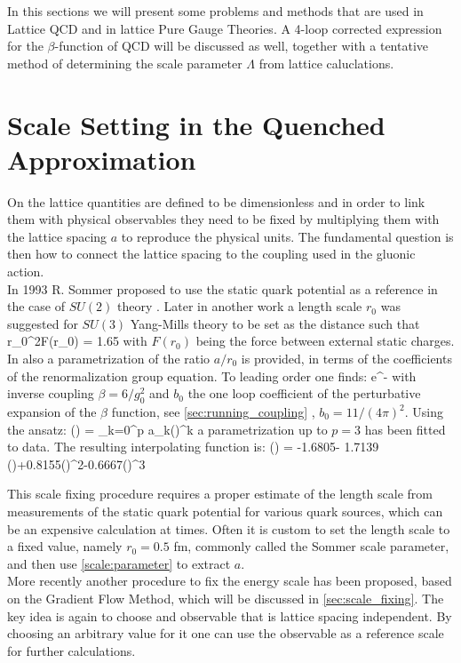 In this sections we will present some problems and methods that are used in Lattice QCD and in lattice Pure Gauge Theories. A 4-loop corrected expression for the $\beta$-function of QCD will be discussed as well, together with a tentative method of determining the scale parameter $\Lambda$ from lattice caluclations.

\section{Scale Setting in the Quenched Approximation}
On the lattice quantities are defined to be dimensionless and in order to link them with physical observables they need to be fixed by multiplying them with the lattice spacing $a$ to reproduce the physical units. The fundamental question is then how to connect the lattice spacing to the coupling used in the gluonic action.\\
In 1993 R. Sommer proposed to use the static quark potential as a reference in the case of $SU(2)$ theory \cite{sommer_new_1994}. Later in another work \cite{guagnelli_precision_1998} a length scale $r_0$ was suggested for $SU(3)$ Yang-Mills theory to be set as the distance such that 
\beq
r_0^2F(r_0) = 1.65
\eeq 
with $F(r_0)$ being the force between external static charges. In \cite{guagnelli_precision_1998} also a parametrization of the ratio $a/r_0$ is provided, in terms of the coefficients of the renormalization group equation. To leading order one finds:
\beq
     \propto e^{-}
\eeq
with inverse coupling $\beta = 6/g_0^2$ and $b_0$ the one loop coefficient of the perturbative expansion of the $\beta$ function, see \cref{sec:running_coupling}
, $b_0=11/(4\pi)^2$. Using the ansatz:
\beq
    \ln\left(\right) = \sum_{k=0}^p a_k()^k
\eeq
a parametrization up to $p=3$ has been fitted to data. The resulting interpolating function is:
\beq
    \ln\left(\right) = -1.6805- 1.7139 ()+0.8155()^2-0.6667()^3
    \label{scale:parameter}
\eeq

 
This scale fixing procedure requires a proper estimate of the length scale from measurements of the static quark potential for various quark sources, which can be an expensive calculation at times. Often it is custom to set the length scale to a fixed value, namely $r_0 = 0.5$ fm, commonly called the Sommer scale parameter, and then use \cref{scale:parameter} to extract $a$. \\
More recently another procedure to fix the energy scale has been proposed, based on the Gradient Flow Method, which will be discussed in \cref{sec:scale_fixing}. The key idea is again to choose and observable that is lattice spacing independent. By choosing an arbitrary value for it one can use the observable as a reference scale for further calculations.  

